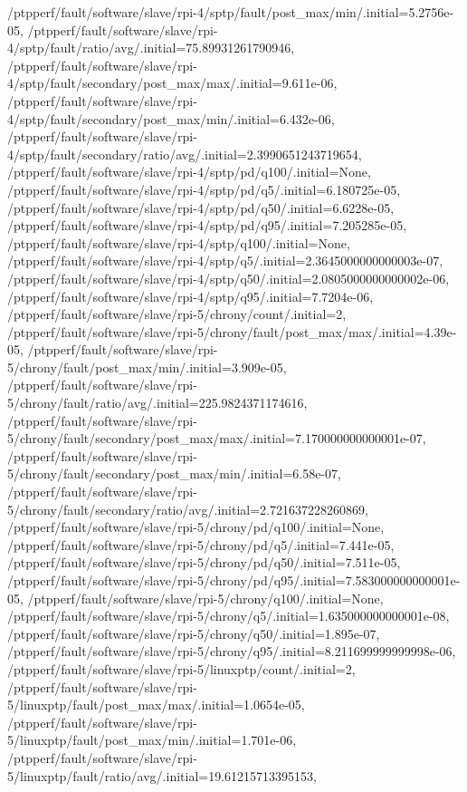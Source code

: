 {    /ptpperf/fault/software/slave/rpi-4/sptp/fault/post_max/min/.initial=5.2756e-05,
    /ptpperf/fault/software/slave/rpi-4/sptp/fault/ratio/avg/.initial=75.89931261790946,
    /ptpperf/fault/software/slave/rpi-4/sptp/fault/secondary/post_max/max/.initial=9.611e-06,
    /ptpperf/fault/software/slave/rpi-4/sptp/fault/secondary/post_max/min/.initial=6.432e-06,
    /ptpperf/fault/software/slave/rpi-4/sptp/fault/secondary/ratio/avg/.initial=2.3990651243719654,
    /ptpperf/fault/software/slave/rpi-4/sptp/pd/q100/.initial=None,
    /ptpperf/fault/software/slave/rpi-4/sptp/pd/q5/.initial=6.180725e-05,
    /ptpperf/fault/software/slave/rpi-4/sptp/pd/q50/.initial=6.6228e-05,
    /ptpperf/fault/software/slave/rpi-4/sptp/pd/q95/.initial=7.205285e-05,
    /ptpperf/fault/software/slave/rpi-4/sptp/q100/.initial=None,
    /ptpperf/fault/software/slave/rpi-4/sptp/q5/.initial=2.3645000000000003e-07,
    /ptpperf/fault/software/slave/rpi-4/sptp/q50/.initial=2.0805000000000002e-06,
    /ptpperf/fault/software/slave/rpi-4/sptp/q95/.initial=7.7204e-06,
    /ptpperf/fault/software/slave/rpi-5/chrony/count/.initial=2,
    /ptpperf/fault/software/slave/rpi-5/chrony/fault/post_max/max/.initial=4.39e-05,
    /ptpperf/fault/software/slave/rpi-5/chrony/fault/post_max/min/.initial=3.909e-05,
    /ptpperf/fault/software/slave/rpi-5/chrony/fault/ratio/avg/.initial=225.9824371174616,
    /ptpperf/fault/software/slave/rpi-5/chrony/fault/secondary/post_max/max/.initial=7.170000000000001e-07,
    /ptpperf/fault/software/slave/rpi-5/chrony/fault/secondary/post_max/min/.initial=6.58e-07,
    /ptpperf/fault/software/slave/rpi-5/chrony/fault/secondary/ratio/avg/.initial=2.721637228260869,
    /ptpperf/fault/software/slave/rpi-5/chrony/pd/q100/.initial=None,
    /ptpperf/fault/software/slave/rpi-5/chrony/pd/q5/.initial=7.441e-05,
    /ptpperf/fault/software/slave/rpi-5/chrony/pd/q50/.initial=7.511e-05,
    /ptpperf/fault/software/slave/rpi-5/chrony/pd/q95/.initial=7.583000000000001e-05,
    /ptpperf/fault/software/slave/rpi-5/chrony/q100/.initial=None,
    /ptpperf/fault/software/slave/rpi-5/chrony/q5/.initial=1.635000000000001e-08,
    /ptpperf/fault/software/slave/rpi-5/chrony/q50/.initial=1.895e-07,
    /ptpperf/fault/software/slave/rpi-5/chrony/q95/.initial=8.211699999999998e-06,
    /ptpperf/fault/software/slave/rpi-5/linuxptp/count/.initial=2,
    /ptpperf/fault/software/slave/rpi-5/linuxptp/fault/post_max/max/.initial=1.0654e-05,
    /ptpperf/fault/software/slave/rpi-5/linuxptp/fault/post_max/min/.initial=1.701e-06,
    /ptpperf/fault/software/slave/rpi-5/linuxptp/fault/ratio/avg/.initial=19.61215713395153,
}
